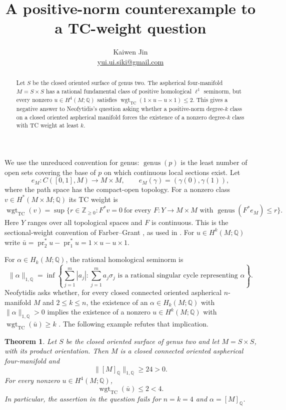 \documentclass[11pt]{article}
\title{A positive-norm counterexample to a TC-weight question}
\author{Kaiwen Jin\\\small\href{mailto:yui.ui.siki@gmail.com}{yui.ui.siki@gmail.com}}
\date{}
\newtheorem{theorem}{Theorem}
\newcommand{\Q}{\mathbb{Q}}
\newcommand{\wt}{\operatorname{wgt}_{\mathrm{TC}}}
\newcommand{\genus}{\operatorname{genus}}
\begin{document}
\maketitle

\begin{abstract}
Let $S$ be the closed oriented surface of genus two. The aspherical
four-manifold $M=S\times S$ has a rational fundamental class of positive
homological $\ell^1$ seminorm, but every nonzero $u\in H^4(M;\Q)$ satisfies
$\wt(1\times u-u\times1)\le2$. This gives a negative answer to
Neofytidis's question asking whether a positive-norm degree-$k$ class on a
closed oriented aspherical manifold forces the existence of a nonzero
degree-$k$ class with TC weight at least $k$.
\end{abstract}

We use the unreduced convention for genus: $\genus(p)$ is the least number
of open sets covering the base of $p$ on which continuous local sections
exist. Let
\[
 e_M:C([0,1],M)\longrightarrow M\times M,
 \qquad e_M(\gamma)=(\gamma(0),\gamma(1)),
\]
where the path space has the compact-open topology. For a nonzero class
$v\in H^*(M\times M;\Q)$ its TC weight is
\begin{equation}\label{eq:weight}
 \wt(v)=\sup\bigl\{r\in\mathbb Z_{\ge0}:
 F^*v=0\ \text{for every }F:Y\to M\times M
 \text{ with }\genus(F^*e_M)\le r\bigr\}.
\end{equation}
Here $Y$ ranges over all topological spaces and $F$ is continuous. This is
the sectional-weight convention of Farber--Grant
\cite[Definition 29]{FG}, as used in \cite[Definition 2.4]{N}.
For $u\in H^k(M;\Q)$ write
$\bar u=\operatorname{pr}_2^*u-\operatorname{pr}_1^*u
=1\times u-u\times1$.

For $\alpha\in H_k(M;\Q)$, the rational homological seminorm is
\[
 \|\alpha\|_{1,\Q}
 =\inf\left\{\sum_{j=1}^m|a_j|:
 \sum_{j=1}^m a_j\sigma_j\text{ is a rational singular cycle
 representing }\alpha\right\}.
\]
Neofytidis asks whether, for every closed connected oriented aspherical
$n$-manifold $M$ and $2\le k\le n$, the existence of an
$\alpha\in H_k(M;\Q)$ with $\|\alpha\|_{1,\Q}>0$ implies the
existence of a nonzero $u\in H^k(M;\Q)$ with $\wt(\bar u)\ge k$
\cite[Question 5.1(a)]{N}. The following example refutes that implication.

\begin{theorem}\label{thm:main}
Let $S$ be the closed oriented surface of genus two and let $M=S\times S$,
with its product orientation. Then $M$ is a closed connected oriented
aspherical four-manifold and
\[
 \|[M]_\Q\|_{1,\Q}\ge24>0.
\]
For every nonzero $u\in H^4(M;\Q)$,
\[
 \wt(\bar u)\le2<4.
\]
In particular, the assertion in the question fails for $n=k=4$ and
$\alpha=[M]_\Q$.
\end{theorem}
\end{document}
